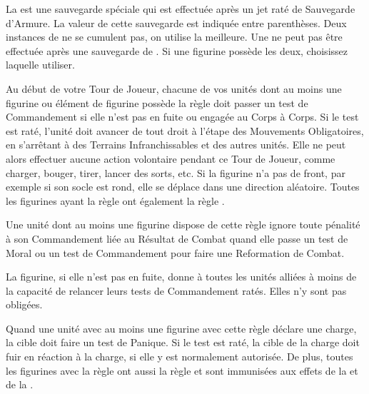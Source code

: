 
La \wardsave{} est une sauvegarde spéciale qui est effectuée après un jet raté de Sauvegarde d'Armure. La valeur de cette sauvegarde est indiquée entre parenthèses. Deux instances de \wardsave{} ne se cumulent pas, on utilise la meilleure. Une \wardsave{} ne peut pas être effectuée après une sauvegarde de \regeneration{}. Si une figurine possède les deux, choisissez laquelle utiliser.


Au début de votre Tour de Joueur, chacune de vos unités dont au moins une figurine ou élément de figurine possède la règle \stupidity{} doit passer un test de Commandement si elle n'est pas en fuite ou engagée au Corps à Corps. Si le test est raté, l'unité doit avancer de  tout droit à l'étape des Mouvements Obligatoires, en s'arrêtant à  des Terrains Infranchissables et des autres unités. Elle ne peut alors effectuer aucune action volontaire pendant ce Tour de Joueur, comme charger, bouger, tirer, lancer des sorts, etc. Si la figurine n'a pas de front, par exemple si son socle est rond, elle se déplace dans une direction aléatoire. Toutes les figurines ayant la règle \stupidity{} ont également la règle \immunetopsychology{}.


Une unité dont au moins une figurine dispose de cette règle ignore toute pénalité à son Commandement liée au Résultat de Combat quand elle passe un test de Moral ou un test de Commandement pour faire une Reformation de Combat.


La figurine, si elle n'est pas en fuite, donne à toutes les unités alliées à moins de  la capacité de relancer leurs tests de Commandement ratés. Elles n'y sont pas obligées.


Quand une unité avec au moins une figurine avec cette règle déclare une charge, la cible doit faire un test de Panique. Si le test est raté, la cible de la charge doit fuir en réaction à la charge, si elle y est normalement autorisée. De plus, toutes les figurines avec la règle \terror{} ont aussi la règle \fear{} et sont immunisées aux effets de la \fear{} et de la \terror{}.


